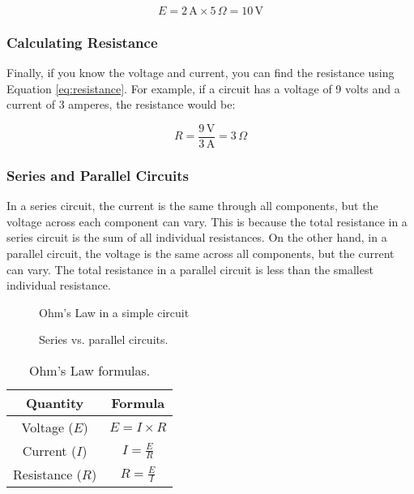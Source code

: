 \[
E = 2\,\text{A} \times 5\,\Omega = 10\,\text{V}
\]

\subsubsection*{Calculating Resistance}
Finally, if you know the voltage and current, you can find the resistance using Equation \ref{eq:resistance}. For example, if a circuit has a voltage of 9 volts and a current of 3 amperes, the resistance would be:

\[
R = \frac{9\,\text{V}}{3\,\text{A}} = 3\,\Omega
\]

\subsubsection*{Series and Parallel Circuits}
In a series circuit, the current is the same through all components, but the voltage across each component can vary. This is because the total resistance in a series circuit is the sum of all individual resistances. On the other hand, in a parallel circuit, the voltage is the same across all components, but the current can vary. The total resistance in a parallel circuit is less than the smallest individual resistance.

\begin{figure}[h!]
    \centering
    \caption{Ohm's Law in a simple circuit}
    \label{fig:ohms-law}
\end{figure}

\begin{figure}[h!]
    \centering

    \caption{Series vs. parallel circuits.}
    \label{fig:series-parallel}
\end{figure}

\begin{table}[h!]
    \centering
    \begin{tabular}{|c|c|}
        \hline
        \textbf{Quantity} & \textbf{Formula} \\
        \hline
        Voltage (\(E\)) & \(E = I \times R\) \\
        Current (\(I\)) & \(I = \frac{E}{R}\) \\
        Resistance (\(R\)) & \(R = \frac{E}{I}\) \\
        \hline
    \end{tabular}
    \caption{Ohm's Law formulas.}
    \label{tab:ohms-law-formulas}
\end{table}

